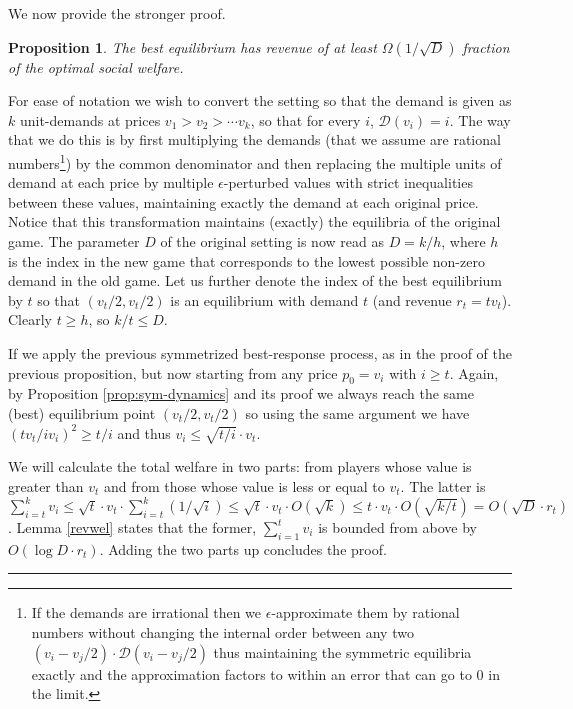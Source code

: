 \documentclass[11pt,a4paper]{article}
\newcommand{\qed}{\rule{1.5mm}{2mm}\vspace{0.1in}}
\newenvironment{proof}{\par\noindent{\bf Proof:}}{\qed}
\newcommand{\D}{\mathcal{D}}
\newtheorem{proposition}[theorem]{Proposition}
\begin{document}
We now provide the stronger proof.

\begin{proposition}
	The best equilibrium has revenue of at least $\Omega(1/\sqrt{D})$
	fraction of the optimal social welfare.
\end{proposition}


\begin{proof}
For ease of notation we wish to convert the setting so that the demand is given as $k$ unit-demands
at prices $v_1 > v_2 > \cdots v_k$, so that for every $i$,
$\D(v_i)=i$.  The way that we do this is by first multiplying the demands (that we assume are rational numbers\footnote{
	If the demands are irrational then we $\epsilon$-approximate them by rational numbers without changing the internal
	order between any two $(v_i - v_j/2) \cdot \D(v_i - v_j/2)$ thus maintaining the symmetric equilibria exactly and the approximation factors to
	within an error that can go to 0 in the limit.})
by the common denominator and then replacing the multiple units of demand at each price by multiple $\epsilon$-perturbed
values with strict inequalities between these values, maintaining exactly the demand at each original price.
Notice that this transformation maintains (exactly) the equilibria of the original game.
The parameter $D$ of the original setting
is now read as $D=k/h$, where $h$ is the index in the new game that corresponds to the lowest possible non-zero demand
in the old game.
Let us further denote the index of the best equilibrium by $t$
so that $(v_t/2,v_t/2)$ is an equilibrium with demand $t$ (and revenue
$r_t=tv_t$).  Clearly $t \ge h$, so $k/t \le D$.

If we apply the previous symmetrized best-response
process, as in the proof of the previous proposition, but now starting from
any price $p_0 = v_i$ with $i \ge t$.  Again, by Proposition \ref{prop:sym-dynamics} and its proof
we always reach the same (best) equilibrium
point $(v_t/2, v_t/2)$ so using the same argument
we have $(t v_t / i v_i)^2 \ge t/i$ and thus $v_i \le \sqrt{t/i} \cdot v_t$.

We will calculate the total welfare in two parts: from
players whose value is greater than $v_t$ and from those whose
value is less or equal to $v_t$.  The latter is
$\sum_{i=t}^k v_i \le \sqrt{t} \cdot v_t \cdot \sum_{i=t}^k (1/\sqrt{i}) \le
\sqrt{t} \cdot v_t \cdot O(\sqrt{k}) \le t \cdot v_t \cdot O(\sqrt{k/t}) = O(\sqrt{D} \cdot r_t)$.
Lemma \ref{revwel} states that the former,
$\sum_{i=1}^t v_i$ is bounded from above by $O(\log D \cdot r_t)$.
Adding the two parts up concludes
the proof.
\end{proof}
\end{document}
